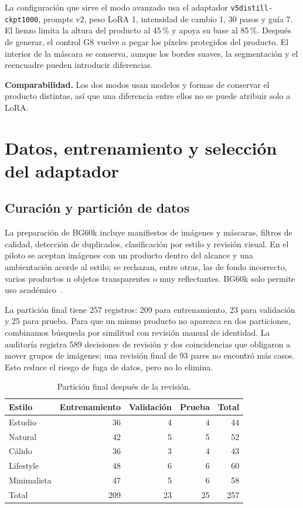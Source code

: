 \documentclass[11pt,a4paper]{article}
\begin{document}
La configuración que sirve el modo avanzado usa el adaptador \texttt{v5distill-ckpt1000}, prompts v2, peso LoRA 1, intensidad de cambio 1, 30 pasos y guía 7. El lienzo limita la altura del producto al 45\,\% y apoya su base al 85\,\%. Después de generar, el control G8 vuelve a pegar los píxeles protegidos del producto. El interior de la máscara se conserva, aunque los bordes suaves, la segmentación y el reencuadre pueden introducir diferencias.

\textbf{Comparabilidad.} Los dos modos usan modelos y formas de conservar el producto distintas, así que una diferencia entre ellos no se puede atribuir solo a LoRA.

\clearpage
\section{Datos, entrenamiento y selección del adaptador}
\subsection{Curación y partición de datos}
La preparación de BG60k incluye manifiestos de imágenes y máscaras, filtros de calidad, detección de duplicados, clasificación por estilo y revisión visual. En el piloto se aceptan imágenes con un producto dentro del alcance y una ambientación acorde al estilo; se rechazan, entre otras, las de fondo incorrecto, varios productos u objetos transparentes o muy reflectantes. BG60k solo permite uso académico~\cite{bg60k}.

La partición final tiene 257 registros: 209 para entrenamiento, 23 para validación y 25 para prueba. Para que un mismo producto no aparezca en dos particiones, combinamos búsqueda por similitud con revisión manual de identidad. La auditoría registra 589 decisiones de revisión y dos coincidencias que obligaron a mover grupos de imágenes; una revisión final de 93 pares no encontró más casos. Esto reduce el riesgo de fuga de datos, pero no lo elimina.

\begin{table}[h]\centering
\caption{Partición final después de la revisión.}
\begin{tabular}{@{}lrrrr@{}}\toprule
Estilo & Entrenamiento & Validación & Prueba & Total \\\midrule
Estudio & 36 & 4 & 4 & 44 \\
Natural & 42 & 5 & 5 & 52 \\
Cálido & 36 & 3 & 4 & 43 \\
Lifestyle & 48 & 6 & 6 & 60 \\
Minimalista & 47 & 5 & 6 & 58 \\\midrule
Total & 209 & 23 & 25 & 257 \\\bottomrule
\end{tabular}
\end{table}
\end{document}
